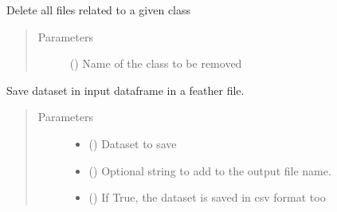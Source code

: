 \documentclass[letterpaper,10pt,english]{sphinxmanual}
\begin{document}
\begin{fulllineitems}
\begin{fulllineitems}
\end{fulllineitems}


\begin{fulllineitems}
\label{\detokenize{dc_data_manager:src.data_manager.DataManager.reset_labels}}
\sphinxAtStartPar
Delete all files related to a given class
\begin{quote}\begin{description}
\item[{Parameters}] \leavevmode
\sphinxAtStartPar
{} () \textendash{} Name of the class to be removed

\end{description}\end{quote}

\end{fulllineitems}


\begin{fulllineitems}
\label{\detokenize{dc_data_manager:src.data_manager.DataManager.save_dataset}}
\sphinxAtStartPar
Save dataset in input dataframe in a feather file.
\begin{quote}\begin{description}
\item[{Parameters}] \leavevmode\begin{itemize}
\item {} 
\sphinxAtStartPar
{} () \textendash{} Dataset to save

\item {} 
\sphinxAtStartPar
{} () \textendash{} Optional string to add to the output file name.

\item {} 
\sphinxAtStartPar
{} () \textendash{} If True, the dataset is saved in csv format too

\end{itemize}

\end{description}\end{quote}

\end{fulllineitems}


\end{fulllineitems}
\end{document}
